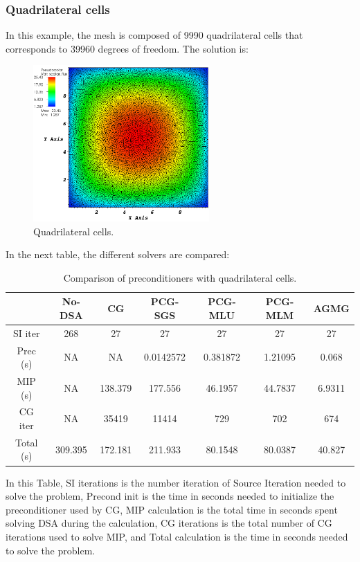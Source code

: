 \subsubsection{Quadrilateral cells}
In this example, the mesh is composed of 9990 quadrilateral cells that corresponds 
to 39960 degrees of freedom. The solution is:
\begin{figure}[H]
\centering
\includegraphics[width=0.6\textwidth]{./Dsa/homog_quad_crop}
\caption{Quadrilateral cells.}
\end{figure}
In the next table, the different solvers are compared:
\begin{table}[H]
\begin{center}
\caption{Comparison of preconditioners with quadrilateral cells.}
\begin{tabular}{|c|c|c|c|c|c|c|}
\hline
 & No-DSA & CG & PCG-SGS & PCG-MLU & PCG-MLM & AGMG\\
\hline
SI iter & 268 & 27 & 27 & 27 & 27 & 27 \\
Prec (s) & NA & NA & 0.0142572 & 0.381872 & 1.21095 & 0.068\\
MIP (s) & NA & 138.379 & 177.556 & 46.1957 & 44.7837 & 6.9311\\
CG iter & NA & 35419 & 11414 & 729 & 702 & 674\\
Total (s) & 309.395 & 172.181 & 211.933 & 80.1548 & 80.0387 &
40.827\\
\hline
\end{tabular}
\end{center}
\end{table}
In this Table, SI iterations is the number iteration of Source Iteration
needed to solve the problem, Precond init is the time in seconds needed to
initialize the preconditioner used by CG, MIP calculation is the total time in
seconds spent solving DSA during the calculation, CG iterations is the total number 
of CG iterations used to solve MIP, and Total calculation is the time in
seconds needed to solve the problem.


